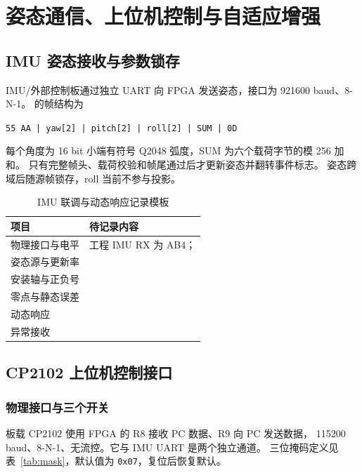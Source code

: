 \chapter{姿态通信、上位机控制与自适应增强}
\label{chap:control}
\section{IMU 姿态接收与参数锁存}
IMU/外部控制板通过独立 UART 向 FPGA 发送姿态，接口为 921600 baud、8-N-1。
 的帧结构为
\begin{center}
\texttt{55 AA | yaw[2] | pitch[2] | roll[2] | SUM | 0D}
\end{center}
每个角度为 16 bit 小端有符号 Q2048 弧度，SUM 为六个载荷字节的模 256 加和。
只有完整帧头、载荷校验和帧尾通过后才更新姿态并翻转事件标志。
姿态跨域后随源帧锁存，roll 当前不参与投影。

\begin{table}[htbp]\centering\small
\caption{IMU 联调与动态响应记录模板}
\begin{tabularx}{\textwidth}{p{3.6cm}Y}
\toprule
项目 & 待记录内容 \\
\midrule
物理接口与电平 & 工程 IMU RX 为 AB4； \\
姿态源与更新率 &  \\
安装轴与正负号 &  \\
零点与静态误差 &  \\
动态响应 &  \\
异常接收 &  \\
\bottomrule
\end{tabularx}
\end{table}

\section{CP2102 上位机控制接口}
\subsection{物理接口与三个开关}
板载 CP2102 使用 FPGA 的 R8 接收 PC 数据、R9 向 PC 发送数据，
115200 baud、8-N-1、无流控。它与 IMU UART 是两个独立通道。
三位掩码定义见表~\ref{tab:mask}，默认值为 \texttt{0x07}，复位后恢复默认。

